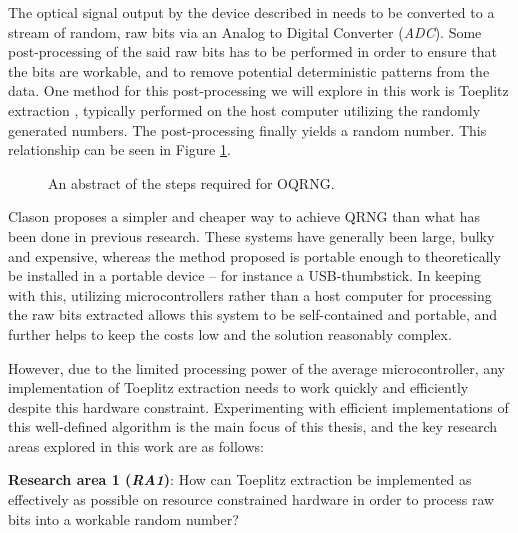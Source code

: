 \documentclass{sigchi}
\begin{document}
The optical signal output by the device described in \cite{Clason2023} needs to be converted to a stream of random, raw bits via an Analog to Digital Converter (\emph{ADC}). Some post-processing of the said raw bits has to be performed in order to ensure that the bits are workable, and to remove potential deterministic patterns from the data. One method for this post-processing we will explore in this work is Toeplitz extraction \cite{toeplitz}, typically performed on the host computer utilizing the randomly generated numbers. The post-processing finally yields a random number. This relationship can be seen in Figure \ref{fig:linear-system}.

\begin{figure}[ht] \centering {} \caption{An abstract of the steps required for OQRNG.}
\label{fig:linear-system} \end{figure}

Clason proposes a simpler and cheaper way to achieve QRNG \cite{Clason2023} than what has been done in previous research. These systems have generally been large, bulky and expensive, whereas the method proposed is portable enough to theoretically be installed in a portable device -- for instance a USB-thumbstick. In keeping with this, utilizing microcontrollers rather than a host computer for processing the raw bits extracted allows this system to be self-contained and portable, and further helps to keep the costs low and the solution reasonably complex.

However, due to the limited processing power of the average microcontroller, any implementation of Toeplitz extraction needs to work quickly and efficiently despite this hardware constraint. Experimenting with efficient implementations of this well-defined algorithm is the main focus of this thesis, and the key research areas explored in this work are as follows:

\textbf{Research area 1 (\emph{RA1})}: How can Toeplitz extraction be implemented as effectively as possible on resource constrained hardware in order to process raw bits into a workable random number?
\end{document}
